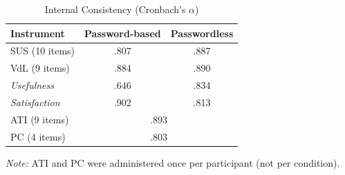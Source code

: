 ﻿%
\begin{table}[H]
    \centering
    \begin{threeparttable}
        \caption{Internal Consistency (Cronbach's $\alpha$)}
        \label{tab:cronbach}
        \begin{tabular}{lcc}
            \toprule
            \textbf{Instrument} & \textbf{Password-based} & \textbf{Passwordless} \\
            \midrule
            SUS (10 items)        & .807  & .887 \\
            VdL (9 items)         & .884  & .890 \\
            \quad \textit{Usefulness}   & .646  & .834 \\
            \quad \textit{Satisfaction} & .902  & .813 \\
            \midrule
            ATI (9 items)         & \multicolumn{2}{c}{.893} \\
            PC (4 items)          & \multicolumn{2}{c}{.803} \\
            \bottomrule
        \end{tabular}
        \begin{tablenotes}
            \small
            \item \textit{Note:} ATI and PC were administered once per participant (not per condition). 
        \end{tablenotes}
    \end{threeparttable}
\end{table}
